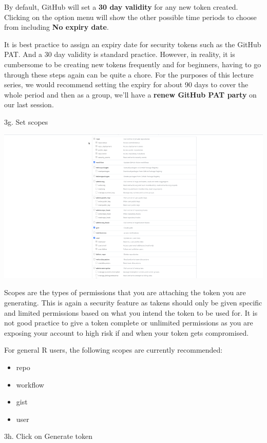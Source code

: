 \documentclass[
  12pt,
]{book}
\providecommand{\tightlist}{%
  \setlength{\itemsep}{0pt}\setlength{\parskip}{0pt}}
\begin{document}
By default, GitHub will set a \textbf{30 day validity} for any new token created. Clicking on the option menu will show the other possible time periods to choose from including \textbf{No expiry date}.

It is best practice to assign an expiry date for security tokens such as the GitHub PAT. And a 30 day validity is standard practice. However, in reality, it is cumbersome to be creating new tokens frequently and for beginners, having to go through these steps again can be quite a chore. For the purposes of this lecture series, we would recommend setting the expiry for about 90 days to cover the whole period and then as a group, we'll have a \textbf{renew GitHub PAT party} on our last session.

3g. Set scopes

\includegraphics{images/github_pat10.png}

Scopes are the types of permissions that you are attaching the token you are generating. This is again a security feature as takens should only be given specific and limited permissions based on what you intend the token to be used for. It is not good practice to give a token complete or unlimited permissions as you are exposing your account to high risk if and when your token gets compromised.

For general R users, the following scopes are currently recommended:

\begin{itemize}
\tightlist
\item
  repo
\item
  workflow
\item
  gist
\item
  user
\end{itemize}

3h. Click on Generate token
\end{document}
